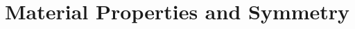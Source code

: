 %




\renewcommand{\chaptergraphicspath}{../src/PropertySymmetry/eps/}

\chapterimage{\noheaderimage}

\chapter{Material Properties and Symmetry\label{chap:PropertySymmetry}}

